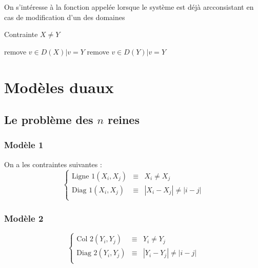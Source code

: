 \documentclass[a4paper,11pt]{thesis}
\begin{document}
\begin{ex}[$X \neq Y$]
    On s'intéresse à la fonction appelée lorsque le système est déjà arcconsistant en cas de
    modification d'un des domaines
    \begin{algorithm}[h!]
        \caption{Contrainte $X \neq Y$}
        \label{revise_xneqy}
        \begin{algorithmic}[1]
                    \State remove $v \in D(X) | v = Y$
                \EndIf
            \EndFunction
                    \State remove $v \in D(Y) | v = Y$
                \EndIf
            \EndFunction
        \end{algorithmic}
    \end{algorithm}
\end{ex}

\section{Modèles duaux}

\subsection{Le problème des $n$ reines}

\subsubsection{Modèle 1}


On a les contraintes suivantes :
\begin{displaymath}
    \left \lbrace \begin{array}{rcl}
        \mbox{Ligne 1}(X_i, X_j) & \equiv & X_i \neq X_j \\
        \mbox{Diag 1} (X_i, X_j) & \equiv & |X_i - X_j| \neq |i - j| \\
    \end{array}
    \right .
\end{displaymath}

\subsubsection{Modèle 2}

\begin{displaymath}
    \left \lbrace \begin{array}{rcl}
        \mbox{Col 2}(Y_i, Y_j) & \equiv & Y_i \neq Y_j \\
        \mbox{Diag 2} (Y_i, Y_j) & \equiv & |Y_i - Y_j| \neq |i - j| \\
    \end{array}
    \right .
\end{displaymath}
\end{document}
